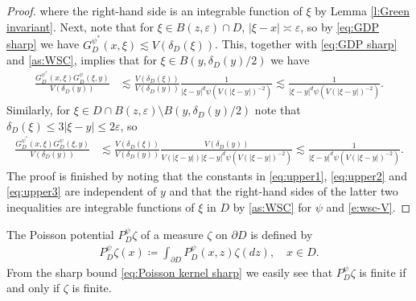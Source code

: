 \documentclass[12pt,a4paper,onecolumn]{article}
\theoremstyle{definition}
\newcommand{\1}{\mathbf 1}
\newcommand{\de}{\delta_D}
\newcommand{\GDP}{G_D^\psi}
\newcommand{\GDPs}{G_D^{\psi^*}}
\newcommand{\PDS}{P^{\psi}_{ D}}
\numberwithin{equation}{section}
\begin{document}
\begin{proof}
	where the right-hand side is an integrable function of $\xi$ by Lemma \ref{l:Green invariant}. Next, note that for $\xi \in B(z,\varepsilon)\cap D$, $|\xi-x|\asymp \varepsilon$, so by \eqref{eq:GDP sharp} we have $\GDPs(x,\xi)\lesssim V(\de(\xi))$. This, together with \eqref{eq:GDP sharp} and \ref{as:WSC}, implies that for $\xi\in B(y,\de(y)/2)$ we have
		\begin{align}\label{eq:upper2}
			\frac{\GDPs(x,\xi)\GDP(\xi,y)}{V(\de(y))}&\lesssim \frac{V(\de(\xi))}{V(\de(y))}\frac{1}{|\xi-y|^d\psi(V(|\xi-y|)^{-2})}\lesssim \frac{1}{|\xi-y|^d\psi(V(|\xi-y|)^{-2})}.
		\end{align}
		Similarly, for $\xi\in D\cap B(z,\varepsilon)\setminus B(y,\de(y)/2)$ note that $\de(\xi)\le 3|\xi-y|\le 2\varepsilon$, so
		\begin{align}\label{eq:upper3}
			\frac{\GDPs(x,\xi)\GDP(\xi,y)}{V(\de(y))}&\lesssim\frac{V(\de(\xi))}{V(\de(y))}\frac{V(\de(y)) }{V(|\xi-y|) |\xi-y|^d\psi(V(|\xi-y|)^{-2})}\lesssim\frac{1 }{|\xi-y|^d\psi(V(|\xi-y|)^{-2})}.
		\end{align}
	The proof is finished by noting that the constants in \eqref{eq:upper1}, \eqref{eq:upper2} and \eqref{eq:upper3} are independent of $y$ and that the right-hand sides of the latter two inequalities are integrable functions of $\xi$ in $D$ by \ref{as:WSC} for $\psi$ and \eqref{e:wsc-V}.
	\end{proof}
The Poisson potential $\PDS \zeta$ of a measure $\zeta$ on $\partial D$ is defined by
		\begin{align*}
			\PDS \zeta(x)\coloneqq \int_{\partial D}\PDS(x,z)\zeta(dz),\quad x\in D.
		\end{align*}
From the sharp bound \eqref{eq:Poisson kernel sharp} we easily see that $\PDS\zeta$ is finite if and only if $\zeta$ is finite.
	
\end{document}

